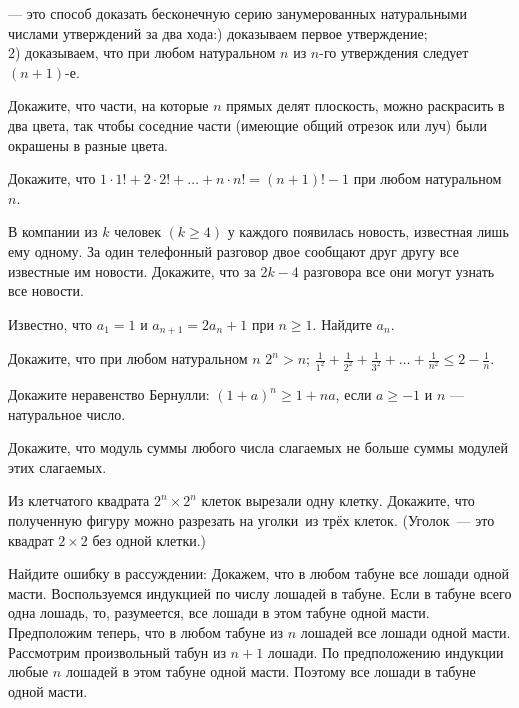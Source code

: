 \documentclass[a4paper,11pt]{article}
\begin{document}

\noindent
{} --- это способ доказать
бесконечную серию занумерованных натуральными числами
утверждений за два хода:) 
доказываем первое утверждение;\\
 2) 
доказываем, что при любом натуральном $n$ из $n$-го
утверждения следует $(n+1)$-е.

\smallskip


Докажите, что части, на которые $n$ прямых делят плоскость, можно
раскрасить в два цвета, так чтобы соседние части (имеющие
общий отрезок или луч) были окрашены в разные цвета.

Докажите, что $1\cdot1!+2\cdot2!+\dots+n\cdot n!=(n+1)!-1$
при любом натуральном $n$.


В компании из $k$ человек $(k\geq4)$ у каждого появилась новость, известная
лишь ему одному. За один телефонный разговор двое сообщают друг другу
все известные им новости. Докажите, что за $2k-4$ разговора все они
могут узнать все новости.

Известно, что
$a_1=1$ и  $a_{n+1}=2a_n+1$ при $n\geq1$.
Найдите $a_n$.


Докажите, что при любом натуральном $n$
 $2^n>n$;
$\displaystyle{\frac1{1^2}+\frac1{2^2}+\frac1{3^2}+\dots
+\frac1{n^2}\leq 2-\frac1{n}}$.


Докажите неравенство Бернулли: $(1+a)^n\geq1+na$, если $a\geq-1$
и $n$ --- натуральное число.

Докажите, что модуль суммы любого числа слагаемых не больше
суммы модулей этих слагаемых.

Из клетчатого квадрата $2^n\times2^n$ клеток вырезали одну клетку.
Докажите, что полученную фигуру можно разрезать на  уголки\
из трёх клеток. ( Уголок\ ---  это квадрат $2\times2$ без одной клетки.)
\кзадача



Найдите ошибку в рассуждении:
 Докажем, что в любом табуне все лошади одной масти. Воспользуемся
индукцией по числу лошадей в табуне.
Если в табуне всего одна лошадь, то, разумеется, все лошади в этом
табуне одной масти.
Предположим теперь, что в любом табуне из $n$ лошадей все лошади одной
масти. Рассмотрим произвольный табун из $n+1$ лошади.
По предположению индукции любые $n$ лошадей в этом табуне
одной масти. Поэтому все лошади в табуне одной масти.
\end{document}
